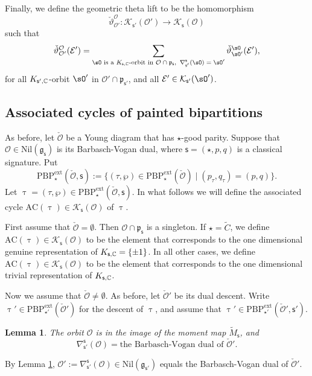 \documentclass[12pt,a4paper]{amsart}
\def\abs#1{\left|{#1}\right|}
\newcommand{\CE}{{\mathcal {E}}}
\newcommand{\CK}{{\mathcal {K}}}
\newcommand{\CO}{{\mathcal {O}}}
\newcommand{\g}{\mathfrak g}
\newcommand{\p}{\mathfrak p}
\numberwithin{equation}{section}
\newtheorem{lem}[thm]{Lemma}
\theoremstyle{remark}
\def\PBPe{\mathrm{PBP}^{\mathrm{ext}}}
\begin{document}
Finally, we define the geometric theta lift to be the homomorphism
\[
 \check \vartheta_{\CO'}^{\CO}: \CK_{\mathsf s'}(\CO')\rightarrow \CK_{\mathsf s}(\CO)
\]
such that
\[
 \check \vartheta_{\CO'}^{\CO}(\CE')= \sum_{\sO\textrm{ is a $K_{\mathsf s, \C} $-orbit in $\CO\cap \p_{\mathsf s}$,  $\, \nabla^{\mathsf s}_{\mathsf s'}(\sO)=\sO'$}}    \check \vartheta_{\sO'}^{\sO}(\CE'),
\]
for all $K_{\mathsf s', \mathbb{C}} $-orbit $\sO'$ in $\CO'\cap \p_{\mathsf s'}$, and all $\CE'\in \CK_{\mathsf s'}(\sO')$.


\subsection{Associated cycles of painted bipartitions}\label{subsecass}

As before, let $\check \CO$ be a Young diagram that has $\star$-good parity. Suppose that  $\CO\in \mathrm{Nil}(\g_\mathsf s)$ is its Barbasch-Vogan dual, where $\mathsf s=(\star, p,q)$ is a classical signature.
Put
\[
  \PBPe_\star(\check \CO,\mathsf s):=\{(\tau, \wp)\in  \PBPe_\star(\check \CO)\mid (p_\tau,q_\tau)=(p,q)\}.
\]
Let $\uptau=(\tau, \wp)\in \PBPe_\star(\check \CO,\mathsf s)$.
In what follows we will define the associated cycle $\mathrm{AC}(\uptau)\in\CK_{\mathsf s}(\CO)$ of $\uptau$.

First assume that $\check \CO=\emptyset$. Then $\CO\cap \p_{\mathsf s}$ is a singleton. If $\star=\widetilde C$, we define $\mathrm{AC}(\uptau)\in\CK_{\mathsf s}(\CO)$ to be the element that corresponds to the one dimensional genuine representation of $K_{\mathsf s,\mathbb{C}} =\{\pm 1\}$. In all other cases, we  define $\mathrm{AC}(\uptau)\in\CK_{\mathsf s}(\CO)$ to be the element that corresponds to the one dimensional trivial representation of $K_{\mathsf s,\mathbb{C}}$.



Now we assume that $\check \CO\neq \emptyset$. As before, let $\check \CO'$ be its dual descent. Write  $\uptau'\in \PBPe_{\star'}(\check \CO')$ for the descent of $\uptau$, and assume that $\uptau'\in \PBPe_{\star'}(\check \CO',\mathsf s')$.

\begin{lem}\label{dualdesc}
The orbit $\CO$ is in the image of the moment map $\tilde M_{\mathsf s}$, and
\[
  \nabla_{\mathsf s'}^{\mathsf s}(\CO)=\textrm{the Barbasch-Vogan dual of $\check \CO'$}.
\]
\end{lem}

 By Lemma  \ref{dualdesc},  $\CO':= \nabla_{\mathsf s'}^{\mathsf s}(\CO)\in \mathrm{Nil}(\g_{\mathsf s'})$ equals the Barbasch-Vogan dual of $\check \CO'$.
\end{document}
